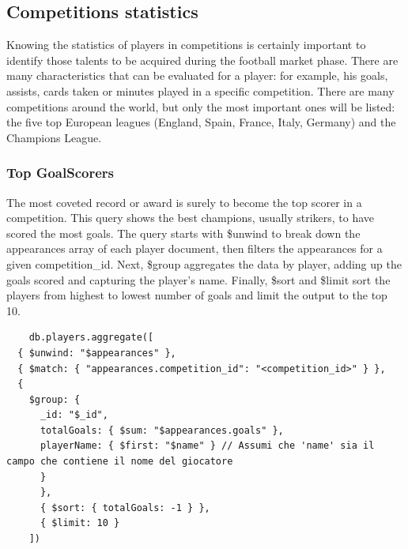 \documentclass{Configuration_Files/PoliMi3i_thesis}
\begin{document}
\subsection{Competitions statistics}
Knowing the statistics of players in competitions is certainly important to identify those talents to be acquired during the football market phase. There are many characteristics that can be evaluated for a player: for example, his goals, assists, cards taken or minutes played in a specific competition.
There are many competitions around the world, but only the most important ones will be listed: the five top European leagues (England, Spain, France, Italy, Germany) and the Champions League.
\subsubsection{Top GoalScorers}
The most coveted record or award is surely to become the top scorer in a competition. This query shows the best champions, usually strikers, to have scored the most goals.
The query starts with \$unwind to break down the appearances array of each player document, then filters the appearances for a given competition\_id. Next, \$group aggregates the data by player, adding up the goals scored and capturing the player's name. Finally, \$sort and \$limit sort the players from highest to lowest number of goals and limit the output to the top 10. 
\begin{verbatim}
    db.players.aggregate([
  { $unwind: "$appearances" },
  { $match: { "appearances.competition_id": "<competition_id>" } },
  {
    $group: {
      _id: "$_id",
      totalGoals: { $sum: "$appearances.goals" },
      playerName: { $first: "$name" } // Assumi che 'name' sia il campo che contiene il nome del giocatore
      }
      },
      { $sort: { totalGoals: -1 } },
      { $limit: 10 }
    ])
    
\end{verbatim}
\end{document}
